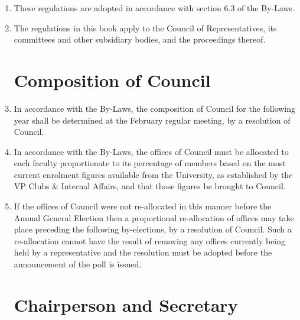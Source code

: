 \documentclass[oneside]{book}
\begin{document}
\begin{enumerate}

\item These regulations are adopted in accordance with section 6.3 of the
By-Laws. 
\item The regulations in this book apply to the Council of Representatives,
its committees and other subsidiary bodies, and the proceedings thereof. 

\chapter{\label{Composition_of_Council}Composition of Council }
\item In accordance with the By-Laws, the composition of Council for the
following year shall be determined at the February regular meeting, by a resolution of Council. 
\item In accordance with the By-Laws, the offices of Council must be allocated
to each faculty proportionate to its percentage of members based on
the most current enrolment figures available from the University, as established by the VP Clubs 
\& Internal Affairs, and that those figures be brought to Council.
\item If the offices of Council were not re-allocated in this manner before the Annual General Election 
then a proportional re-allocation of offices may take place preceding the following by-elections, 
by a resolution of Council. Such a re-allocation cannot have the result of removing any offices 
currently being held by a representative and the resolution must be adopted before the announcement 
of the poll is issued.

\chapter{\label{Chairperson_and_Secretary}Chairperson and Secretary }



\end{enumerate}
\end{document}

